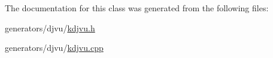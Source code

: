 The documentation for this class was generated from the following files\+:\begin{DoxyCompactItemize}
\item 
generators/djvu/\hyperlink{kdjvu_8h}{kdjvu.\+h}\item 
generators/djvu/\hyperlink{kdjvu_8cpp}{kdjvu.\+cpp}\end{DoxyCompactItemize}
